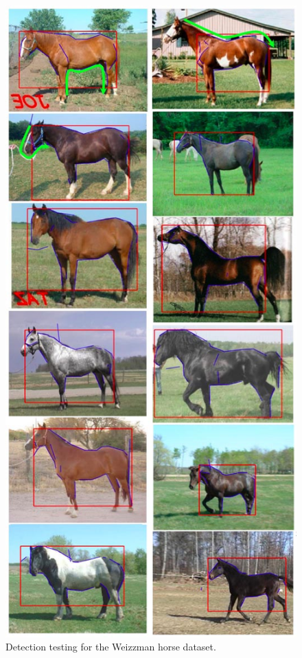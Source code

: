 \documentclass[journal]{IEEEtran}
\begin{document}
\begin{figure}[!t]
\centering
\includegraphics[width=0.95\linewidth]{images/fig21.jpg}
\caption{Detection testing for the Weizzman horse dataset.}
\label{fig:21}
\end{figure}
\end{document}
